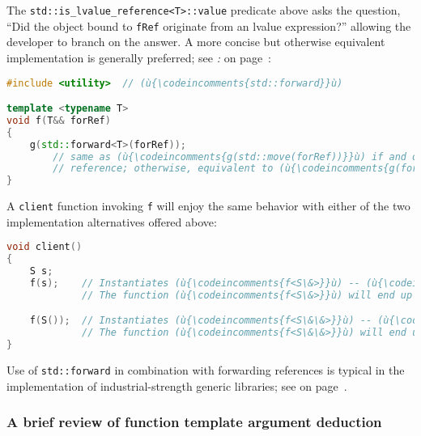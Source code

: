 \noindent The \texttt{std::is\_lvalue\_reference<T>::value} predicate above asks
the question, ``Did the object bound to \texttt{fRef} originate
from an lvalue expression?'' allowing the developer to branch on the
answer. A more concise but otherwise equivalent implementation is
generally preferred; see \textit{: } on page~\pageref{the-std::forward-utility}:

\begin{lstlisting}[language=C++]
#include <utility>  // (ù{\codeincomments{std::forward}}ù)

template <typename T>
void f(T&& forRef)
{
    g(std::forward<T>(forRef));
        // same as (ù{\codeincomments{g(std::move(forRef))}}ù) if and only if (ù{\codeincomments{forRef}}ù) is an *rvalue*
        // reference; otherwise, equivalent to (ù{\codeincomments{g(forRef)}}ù)
}
\end{lstlisting}
    
\noindent A \texttt{client} function invoking \texttt{f} will enjoy the same
behavior with either of the two implementation alternatives offered
above:

\begin{lstlisting}[language=C++]
void client()
{
    S s;
    f(s);    // Instantiates (ù{\codeincomments{f<S\&>}}ù) -- (ù{\codeincomments{fRef}}ù) is an lvalue reference ((ù{\codeincomments{S\&}}ù)).
             // The function (ù{\codeincomments{f<S\&>}}ù) will end up invoking (ù{\codeincomments{g(S\&)}}ù).

    f(S());  // Instantiates (ù{\codeincomments{f<S\&\&>}}ù) -- (ù{\codeincomments{fRef}}ù) is an rvalue reference ((ù{\codeincomments{S\&\&}}ù)).
             // The function (ù{\codeincomments{f<S\&\&>}}ù) will end up invoking (ù{\codeincomments{g(S\&\&)}}ù).
}
\end{lstlisting}
    
\noindent Use of \texttt{std::forward} in combination with forwarding references
is typical in the implementation of industrial-strength generic
libraries; see \textit{} on page~\pageref{use-cases-forwardingref}.

\subsubsection[A brief review of function template argument deduction]{A brief review of function template argument deduction}\label{a-brief-review-of-function-template-argument-deduction}


